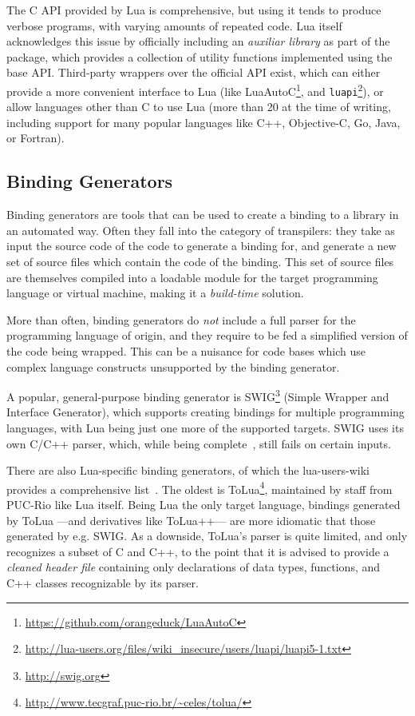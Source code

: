 The C API provided by Lua is comprehensive, but using it tends to produce
verbose programs, with varying amounts of repeated code. Lua itself
acknowledges this issue by officially including an \emph{auxiliar library}
as part of the package, which provides a collection of utility functions
implemented using the base API. Third-party wrappers over the official API
exist, which can either provide a more convenient interface to Lua (like
LuaAutoC\footnote{\url{https://github.com/orangeduck/LuaAutoC}}, and
\verb|luapi|\footnote{\url{http://lua-users.org/files/wiki_insecure/users/luapi/luapi5-1.txt}}),
or allow languages other than C to use Lua (more than
20 at the time of writing, including support for many popular languages like
C++, Objective-C, Go, Java, or Fortran).


\subsection{Binding Generators}
	\label{sec:binding-generators}

Binding generators are tools that can be used to create a binding to a library
in an automated way. Often they fall into the category of \glspl{transpiler}:
they take as input the source code of the code to generate a binding for,
and generate a new set of source files which contain the code of the binding.
This set of source files are themselves compiled into a loadable module for
the target programming language or virtual machine, making it a
\emph{build-time} solution.

More than often, binding generators do \emph{not} include a full parser for
the programming language of origin, and they require to be fed a simplified
version of the code being wrapped. This can be a nuisance for code bases which
use complex language constructs unsupported by the binding generator.

A popular, general-purpose binding generator is
SWIG\footnote{\url{http://swig.org}} (Simple Wrapper and Interface Generator),
which supports creating bindings for multiple programming languages, with Lua
being just one more of the supported targets. SWIG uses its own C/C++ parser,
which, while being complete~\cite{swig3doc}, still fails on certain inputs.

There are also Lua-specific binding generators, of which the
\gls{lua-users-wiki} provides a comprehensive
list~\cite{lusers-BindingCodeToLua}. The oldest is
ToLua\footnote{\url{http://www.tecgraf.puc-rio.br/~celes/tolua/}}, maintained
by staff from \gls{PUC-Rio} like Lua itself. Being Lua the only target
language, bindings generated by ToLua —and derivatives like ToLua++— are more
idiomatic that those generated by e.g. SWIG. As a downside, ToLua's parser is
quite limited, and only recognizes a subset of C and C++, to the point that it
is advised to provide a \emph{cleaned header file} containing only
declarations of data types, functions, and C++ classes recognizable by its
parser.


